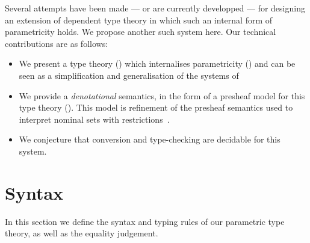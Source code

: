 \documentclass[english]{PaperTools/latex/lipics}
\begin{document}
Several attempts have been made
\citep{bernardy_computational_2012,bernardy_type-theory_2013} --- or are currently
developped \citep{altenkirch2014syntax} ---
for designing an extension of dependent type theory in which such an internal form of
parametricity holds. We propose another such system here.
Our technical contributions are as follows:
\begin{itemize}
\item We present a type theory () which internalises parametricity ()
  and can be seen as a simplification and generalisation of the systems of
  \cite{bernardy_computational_2012,bernardy_type-theory_2013}
\item We provide a \emph{denotational} semantics, in the form of a presheaf model for this type theory ().
      This model is refinement of the presheaf semantics used to
      interpret nominal sets with
      restrictions~\citep{bezem2014model,DBLP:journals/corr/Pitts14}.
\item We conjecture that conversion and type-checking are decidable for this system.
\end{itemize}

\section{Syntax}
\label{sec:syntax}
In this section we define the syntax and typing rules of our
parametric type theory, as well as the equality judgement.
\end{document}
